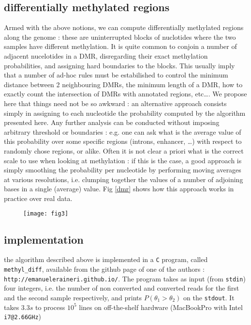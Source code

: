 \documentclass[11pt]{amsart}
\begin{document}
\subsection{differentially methylated regions}
Armed with the above notions, we can compute differentially methylated regions along the genome : these are uninterrupted blocks of nuclotides where the two samples have different methylation. It is quite common to conjoin a number of adjacent nucelotides in a DMR, disregarding their exact methylation probabilities, and assigning hard boundaries to the blocks. This usually imply that a number of ad-hoc rules must be estabilished to control the minimum distance between 2 neighbouring DMRs, the minimum length of a DMR, how to exactly count the intersection of DMRs with annotated regions, etc\dots. We propose here that things need not be so awkward : an alternative approach consists simply in assigning to each nucleotide the probability computed by the algorithm presented here. Any further analysis can be conducted without imposing arbitrary threshold or boundaries : e.g. one can ask what is the average value of this probability over some specific regions (introns, enhancer, \dots) with respect to randomly chose regions, or alike. Often it is not clear a priori what is the correct scale to use when looking at methylation : if this is the case, a good approach is simply smoothing the probability per nucleotide by performing moving averages at various resolutions, i.e. clumping together the values of a number of adjoining bases in a single (average) value. Fig \ref{dmr} shows how this approach works in practice over real data.
\begin{figure}[h]
\caption{}
\texttt{[image: fig3]}
\end{figure}\label{dmr}

\subsection{implementation}
the algorithm described above is implemented in a \verb=C= program, called \verb=methyl_diff=, available from the github page of one of the authors : \verb=http://emanueleraineri.github.io/=. The program takes as input (from \verb=stdin=) four integers, i.e. the number of non converted and converted reads for the first and the second sample respectively, and prints $P(\theta_1>\theta_2)$ on the \verb=stdout=. It takes $3.3s$ to process $10^5$ lines on off-the-shelf hardware (MacBookPro with Intel \verb=i7@2.66GHz=) 


\end{document}

